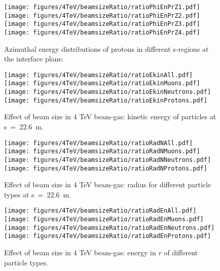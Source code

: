 \begin{figure}%
\begin{center}
  \texttt{[image: figures/4TeV/beamsizeRatio/ratioPhiEnPrZ1.pdf]}
  \texttt{[image: figures/4TeV/beamsizeRatio/ratioPhiEnPrZ2.pdf]}
  \texttt{[image: figures/4TeV/beamsizeRatio/ratioPhiEnPrZ3.pdf]}
  \texttt{[image: figures/4TeV/beamsizeRatio/ratioPhiEnPrZ4.pdf]}
\end{center}
\vspace{-0.6cm}
 \caption{Azimuthal energy distributions of protons in different s-regions at the interface plane.
  \label{bsZPr}}
\end{figure}

\begin{figure}%
\begin{center}
  \texttt{[image: figures/4TeV/beamsizeRatio/ratioEkinAll.pdf]}
  \texttt{[image: figures/4TeV/beamsizeRatio/ratioEkinMuons.pdf]}
  \texttt{[image: figures/4TeV/beamsizeRatio/ratioEkinNeutrons.pdf]}
  \texttt{[image: figures/4TeV/beamsizeRatio/ratioEkinProtons.pdf]}
\end{center}
\vspace{-0.6cm}
 \caption{Effect of beam size in 4 TeV beam-gas: kinetic energy of particles at s~=~22.6~m.
  \label{bsRatioEkin}}
\end{figure}

\begin{figure}%
\begin{center}
  \texttt{[image: figures/4TeV/beamsizeRatio/ratioRadNAll.pdf]}
  \texttt{[image: figures/4TeV/beamsizeRatio/ratioRadNMuons.pdf]}
  \texttt{[image: figures/4TeV/beamsizeRatio/ratioRadNNeutrons.pdf]}
  \texttt{[image: figures/4TeV/beamsizeRatio/ratioRadNProtons.pdf]}
\end{center}
\vspace{-0.6cm}
 \caption{Effect of beam size in 4 TeV beam-gas: radius for different particle types at s~=~22.6~m.
  \label{bsRatioRadN}}
\end{figure}

\begin{figure}%
\begin{center}
  \texttt{[image: figures/4TeV/beamsizeRatio/ratioRadEnAll.pdf]}
  \texttt{[image: figures/4TeV/beamsizeRatio/ratioRadEnMuons.pdf]}
  \texttt{[image: figures/4TeV/beamsizeRatio/ratioRadEnNeutrons.pdf]}
  \texttt{[image: figures/4TeV/beamsizeRatio/ratioRadEnProtons.pdf]}
\end{center}
\vspace{-0.6cm}
 \caption{Effect of beam size in 4 TeV beam-gas: energy in $r$ of different particle types.
  \label{bsRatioRadEn}}
\end{figure}


